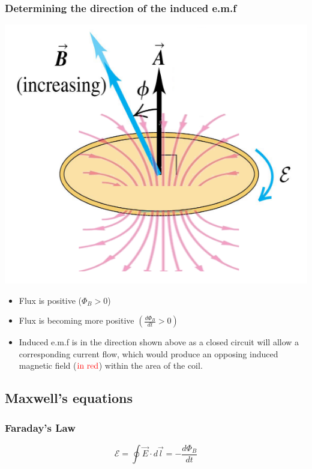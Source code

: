 \documentclass[11pt]{article}
\begin{document}
\subsubsection{Determining the direction of the induced e.m.f}
\label{sec:org01cb5ef}
\begin{center}
\includegraphics[width=.9\linewidth]{./images/lenz-law.png}
\end{center}

\begin{itemize}
\item Flux is positive (\(\Phi_B > 0\))
\item Flux is becoming more positive \((\frac{d \Phi_B}{dt} > 0)\)
\item Induced e.m.f is in the direction shown above as a closed circuit will allow a corresponding current flow, which would produce an opposing induced magnetic field (\(\textcolor{red}{\text{in red}}\)) within the area of the coil.
\end{itemize}


\subsection{Maxwell's equations}
\label{sec:orgd906638}

\subsubsection{Faraday's Law}
\label{sec:orgf421c80}
\[\mathcal{E} = \oint \vec{E} \cdot d \vec{l} = - \frac{d \Phi_B}{dt}\]
\end{document}
